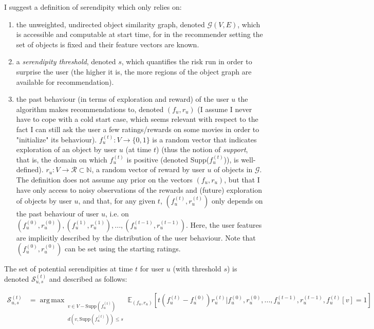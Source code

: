 \documentclass{article}
\DeclareMathOperator*{\argmax}{arg\,max\,}
\begin{document}
I suggest a definition of serendipity which only relies on:
\begin{enumerate} 
\item the unweighted, undirected object similarity graph, denoted $\mathscr{G}(V, E)$, which is accessible and computable at start time, for in the recommender setting the set of objects is fixed and their feature vectors are known.
\item a \textit{serendipity threshold}, denoted $s$, which quantifies the risk run in order to surprise the user (the higher it is, the more regions of the object graph are available for recommendation).
\item the past behaviour (in terms of exploration and reward) of the user $u$ the algorithm makes recommendations to, denoted $(f_{u}, r_{u})$ (I assume I never have to cope with a cold start case, which seems relevant with respect to the fact I can still ask the user a few ratings/rewards on some movies in order to "initialize" its behaviour). $f^{(t)}_u : V \rightarrow \{0,1\}$ is a random vector that indicates exploration of an object by user $u$ (at time $t$) (thus the notion of \textit{support}, that is, the domain on which $f^{(t)}_{u}$ is positive (denoted Supp($f^{(t)}_{u}$)), is well-defined). $r_u : V \rightarrow \mathscr{R} \subset \mathbb{N}$, a random vector of reward by user $u$ of objects in $\mathscr{G}$. The definition does not assume any prior on the vectors $(f_{u}, r_{u})$, but that I have only access to noisy observations of the rewards and (future) exploration of objects by user $u$, and that, for any given $t$, $(f^{(t)}_{u}, r^{(t)}_{u})$ only depends on the past behaviour of user $u$, i.e. on $(f^{(0)}_{u}, r^{(0)}_{u}), (f^{(1)}_{u}, r^{(1)}_{u}), ..., (f^{(t-1)}_{u}, r^{(t-1)}_{u})$. Here, the user features are implicitly described by the distribution of the user behaviour. Note that $(f^{(0)}_{u}, r^{(0)}_{u})$ can be set using the starting ratings.
\end{enumerate}

The set of potential serendipities at time $t$ for user $u$ (with threshold $s$) is denoted $\mathscr{S}^{(t)}_{u,s}$ and described as follows:

\begin{equation}\label{eq:02}
\begin{split}
\mathscr{S}^{(t)}_{u,s} & = \argmax_{\substack{v \in V-\text{Supp}(f^{(t)}_{u})\\d(v, \text{Supp}(f^{(t)}_{u})) \leq s}} \mathbb{E}_{(f_{u},r_{u})}[t(f^{(t)}_{u}-f^{(0)}_{u})r^{(t)}_{u} | f^{(0)}_{u}, r^{(0)}_{u}, ..., f^{(t-1)}_{u}, r^{(t-1)}_{u}, f^{(t)}_{u}[v] = 1 ]\\
\end{split}
\end{equation}
\end{document}
